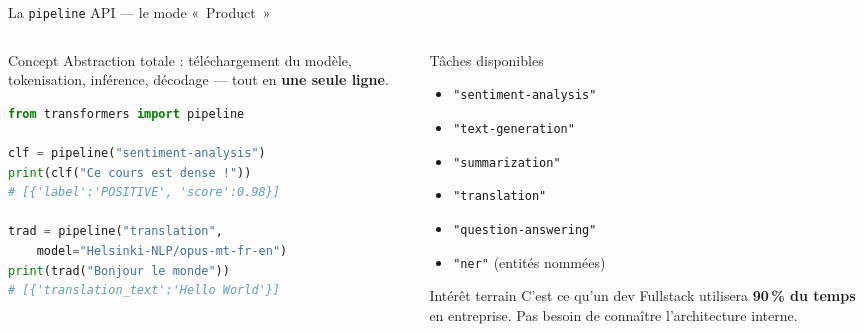 \documentclass[aspectratio=169, 10pt]{beamer}
\begin{document}
\begin{frame}[fragile]{La \texttt{pipeline} API --- le mode «~Product~»}
  \begin{columns}[T]
    \begin{column}{0.52\textwidth}
      \begin{block}{Concept}
        Abstraction totale : téléchargement du modèle,
        tokenisation, inférence, décodage --- tout en
        \textbf{une seule ligne}.
      \end{block}
      \smallskip
\begin{lstlisting}[language=Python]
from transformers import pipeline

clf = pipeline("sentiment-analysis")
print(clf("Ce cours est dense !"))
# [{'label':'POSITIVE', 'score':0.98}]

trad = pipeline("translation",
    model="Helsinki-NLP/opus-mt-fr-en")
print(trad("Bonjour le monde"))
# [{'translation_text':'Hello World'}]
\end{lstlisting}
    \end{column}
    \begin{column}{0.44\textwidth}
      \begin{exampleblock}{Tâches disponibles}
        \begin{itemize}
          \item \texttt{"sentiment-analysis"}
          \item \texttt{"text-generation"}
          \item \texttt{"summarization"}
          \item \texttt{"translation"}
          \item \texttt{"question-answering"}
          \item \texttt{"ner"} (entités nommées)
        \end{itemize}
      \end{exampleblock}
      \vspace{2pt}
      \begin{alertblock}{Intérêt terrain}
        C'est ce qu'un dev Fullstack utilisera
        \textbf{90\,\% du temps} en entreprise.
        Pas besoin de connaître l'architecture interne.
      \end{alertblock}
    \end{column}
  \end{columns}
\end{frame}
\end{document}
